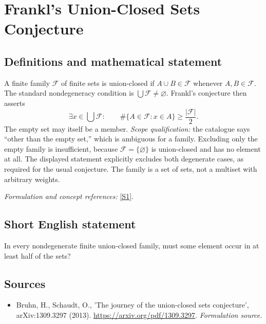 \documentclass[11pt]{article}
\begin{document}
\section*{\texorpdfstring{Frankl's Union-Closed Sets Conjecture}{Frankl's Union-Closed Sets Conjecture}}\label{statement}
\subsection{Definitions and mathematical statement}
A finite family $\mathcal F$ of finite sets is union-closed if $A\cup B\in\mathcal F$ whenever $A,B\in\mathcal F$. The standard nondegeneracy condition is $\bigcup\mathcal F\ne\varnothing$. Frankl's conjecture then asserts
\[
 \exists x\in\bigcup\mathcal F:\qquad
 \#\{A\in\mathcal F:x\in A\}\ge\frac{|\mathcal F|}{2}.
\]
The empty set may itself be a member. \emph{Scope qualification:} the catalogue says ``other than the empty set,'' which is ambiguous for a family. Excluding only the empty family is insufficient, because $\mathcal F=\{\varnothing\}$ is union-closed and has no element at all. The displayed statement explicitly excludes both degenerate cases, as required for the usual conjecture. The family is a set of sets, not a multiset with arbitrary weights.
\par\smallskip\textit{Formulation and concept references:} \href{https://arxiv.org/pdf/1309.3297}{[S1]}.

\subsection{Short English statement}
In every nondegenerate finite union-closed family, must some element occur in at least half of the sets?
\subsection{Sources}
\begin{itemize}
\item[S1]Bruhn, H., Schaudt, O., 'The journey of the union-closed sets conjecture', arXiv:1309.3297 (2013).
\url{https://arxiv.org/pdf/1309.3297}.
\textit{Formulation source.}
\end{itemize}
\end{document}
